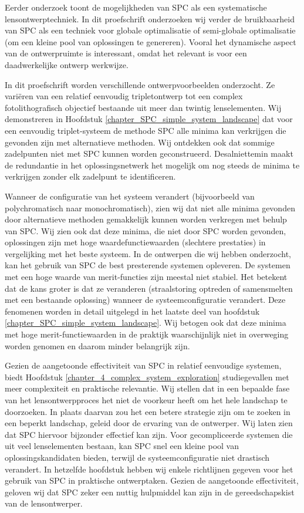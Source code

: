 {%
Eerder onderzoek toont de mogelijkheden van SPC als een systematische lensontwerptechniek. In dit proefschrift onderzoeken wij verder de bruikbaarheid van SPC als een techniek voor globale optimalisatie of semi-globale optimalisatie (om een kleine pool van oplossingen te genereren). Vooral het dynamische aspect van de ontwerpruimte is interessant, omdat het relevant is voor een daadwerkelijke ontwerp werkwijze.

In dit proefschrift worden verschillende ontwerpvoorbeelden onderzocht. Ze variëren van een relatief eenvoudig tripletontwerp tot een complex fotolithografisch objectief bestaande uit meer dan twintig lenselementen. Wij demonstreren in Hoofdstuk \ref{chapter_SPC_simple_system_landscape} dat voor een eenvoudig triplet-systeem de methode SPC alle minima kan verkrijgen die gevonden zijn met alternatieve methoden. Wij ontdekken ook dat sommige zadelpunten niet met SPC kunnen worden geconstrueerd. Desalniettemin maakt de redundantie in het oplossingsnetwerk het mogelijk om nog steeds de minima te verkrijgen zonder elk zadelpunt te identificeren.

Wanneer de configuratie van het systeem verandert (bijvoorbeeld van polychromatisch naar monochromatisch), zien wij dat niet alle minima gevonden door alternatieve methoden gemakkelijk kunnen worden verkregen met behulp van SPC. Wij zien ook dat deze minima, die niet door SPC worden gevonden, oplossingen zijn met hoge waardefunctiewaarden (slechtere prestaties) in vergelijking met het beste systeem. In de ontwerpen die wij hebben onderzocht, kan het gebruik van SPC de best presterende systemen opleveren. De systemen met een hoge waarde van merit-functies zijn meestal niet stabiel. Het betekent dat de kans groter is dat ze veranderen (straalstoring optreden of samensmelten met een bestaande oplossing) wanneer de systeemconfiguratie verandert. Deze fenomenen worden in detail uitgelegd in het laatste deel van hoofdstuk \ref{chapter_SPC_simple_system_landscape}. Wij betogen ook dat deze minima met hoge merit-functiewaarden in de praktijk waarschijnlijk niet in overweging worden genomen en daarom minder belangrijk zijn.

Gezien de aangetoonde effectiviteit van SPC in relatief eenvoudige systemen, biedt Hoofdstuk \ref{chapter_4_complex_system_exploration} studiegevallen met meer complexiteit en praktische relevantie. Wij stellen dat in een bepaalde fase van het lensontwerpproces het niet de voorkeur heeft om het hele landschap te doorzoeken. In plaats daarvan zou het een betere strategie zijn om te zoeken in een beperkt landschap, geleid door de ervaring van de ontwerper. Wij laten zien dat SPC hiervoor bijzonder effectief kan zijn. Voor gecompliceerde systemen die uit veel lenselementen bestaan, kan SPC snel een kleine pool van oplossingskandidaten bieden, terwijl de systeemconfiguratie niet drastisch verandert. In hetzelfde hoofdstuk hebben wij enkele richtlijnen gegeven voor het gebruik van SPC in praktische ontwerptaken. Gezien de aangetoonde effectiviteit, geloven wij dat SPC zeker een nuttig hulpmiddel kan zijn in de gereedschapskist van de lensontwerper.

}

